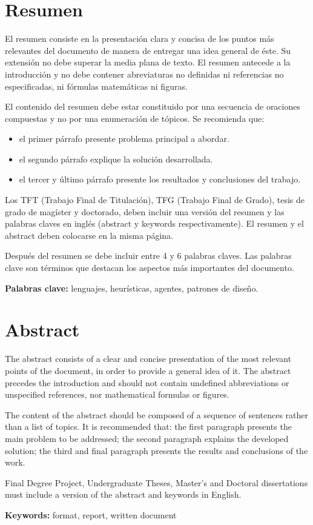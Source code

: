 \chapter*{Resumen}

El resumen consiste en la presentación clara y concisa de los puntos más relevantes del documento de manera de entregar una idea general de éste. Su extensión no debe superar la media plana de texto. 
El resumen antecede a la introducción y no debe contener abreviaturas no definidas ni referencias no especificadas, ni fórmulas matemáticas ni figuras. 

El contenido del resumen debe estar constituido por una secuencia de oraciones compuestas y no por una enumeración de tópicos. Se recomienda que: 
\begin{itemize}
    \item el primer párrafo presente problema principal a abordar.
    \item el segundo párrafo explique la solución desarrollada.
    \item el tercer y último párrafo presente los resultados y conclusiones del trabajo.
\end{itemize}

Los TFT (Trabajo Final de Titulación), TFG (Trabajo Final de Grado), tesis de grado de magíster y doctorado, deben incluir una versión del resumen y las palabras claves en inglés (abstract y keywords respectivamente). El resumen y el abstract deben colocarse en la misma página.

Después del resumen se debe incluir entre 4 y 6 palabras claves. Las palabras
clave son términos que destacan los aspectos más importantes del documento.

{\bf Palabras clave:} lenguajes, heurísticas, agentes, patrones de diseño.


\vspace{3cm}
\begingroup
\let\clearpage\relax %
\chapter*{Abstract}
The abstract consists of a clear and concise presentation of the most relevant points of the document, in order to provide a general idea of it. The abstract precedes the introduction and should not contain undefined abbreviations or unspecified references, nor mathematical formulas or figures. 

The content of the abstract should be composed of a sequence of sentences rather than a list of topics. It is recommended that: the first paragraph presents the main problem to be addressed; the second paragraph explains the developed solution; the third and final paragraph presents the results and conclusions of the work.

Final Degree Project, Undergraduate Theses, Master's and Doctoral dissertations must include a version of the abstract and keywords in English.

{\bf Keywords:} format, report, written document
\endgroup